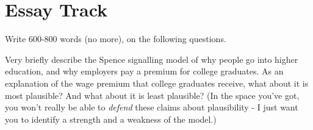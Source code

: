 \documentclass[
  11pt,
]{article}
\begin{document}
\hypertarget{essay-track}{%
\section{Essay Track}\label{essay-track}}

Write 600-800 words (no more), on the following questions.

Very briefly describe the Spence signalling model of why people go into
higher education, and why employers pay a premium for college graduates.
As an explanation of the wage premium that college graduates receive,
what about it is most plausible? And what about it is least plausible?
(In the space you've got, you won't really be able to \emph{defend}
these claims about plausibility - I just want you to identify a strength
and a weakness of the model.)
\end{document}
